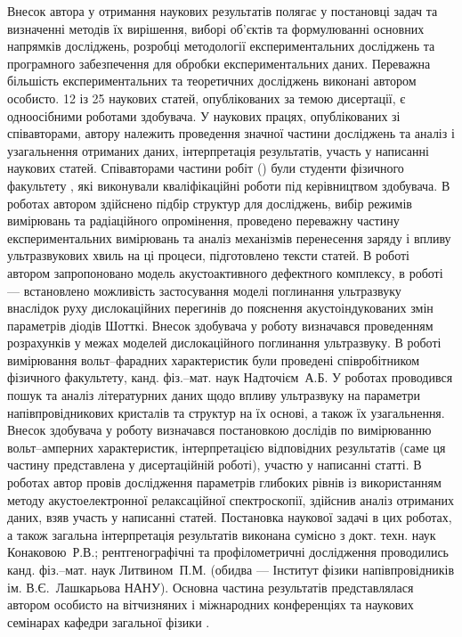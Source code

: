 {\contributionTXT}
Внесок автора у отримання наукових результатів полягає у постановці задач
та визначенні методів їх вирішення, виборі об'єктів та формулюванні
основних напрямків досліджень,
розробці методології експериментальних досліджень та програмного забезпечення для обробки експериментальних даних.
Переважна більшість експериментальних та теоретичних досліджень виконані автором особисто.
12 із 25 наукових статей, опублікованих за темою дисертації, є одноосібними роботами здобувача.
У наукових працях, опублікованих зі співавторами, автору належить проведення значної частини досліджень та аналіз і узагальнення отриманих
даних, інтерпретація результатів, участь у написанні наукових статей.
Співавторами частини робіт (\cite{Olikh2018JAP,Olikh:Ultras2016,Olikh2016JSem,OlikhJAP,Olikh:PZTF2006}) були студенти фізичного факультету \thesisOfOrganization,
які виконували кваліфікаційні роботи під керівництвом здобувача.
В роботах \cite{Olikh2018JAP,Olikh:Ultras2016,Olikh2016JSem,OlikhJAP,Olikh:SEMT2007,Olikh:MRS2007a,Olikh:PZTF2006} автором здійснено підбір структур для досліджень, вибір режимів вимірювань та радіаційного опромінення,
проведено переважну частину експериментальних вимірювань та аналіз механізмів перенесення заряду і впливу ультразвукових хвиль на ці процеси,
підготовлено тексти статей.
В роботі \cite{Olikh2018JAP} автором запропоновано модель акустоактивного дефектного комплексу,
в роботі \cite{Olikh:Ultras2016} --- встановлено можливість застосування моделі поглинання ультразвуку внаслідок руху дислокаційних перегинів до пояснення акустоіндукованих змін параметрів діодів Шотткі.
Внесок здобувача у роботу \cite{Olikh:UPJ2014} визначався проведенням розрахунків у межах моделей дислокаційного поглинання ультразвуку.
В роботі \cite{Olikh:UPJ2013} вимірювання вольт--фарадних характеристик були проведені співробітником фізичного факультету, канд. фіз.--мат. наук Надточієм~А.\:Б.
У роботах \cite{Olikh:SEMT2004,Olikh:SEMT2011} проводився пошук та аналіз літературних даних щодо впливу ультразвуку на параметри напівпровідникових кристалів та структур на їх основі, а також їх узагальнення.
Внесок здобувача у роботу \cite{Gorb2010} визначався постановкою дослідів по вимірюванню вольт--амперних характеристик,
інтерпретацією відповідних результатів (саме ця частину представлена у дисертаційній роботі), участю у написанні статті.
В роботах \cite{Olikh:PhChOM2005,Olikh:PJE2004} автор провів дослідження параметрів глибоких рівнів із використанням методу акустоелектронної релаксаційної спектроскопії,
здійснив аналіз отриманих даних, взяв участь у написанні статей.
Постановка наукової задачі в цих роботах, а також загальна інтерпретація результатів виконана сумісно з докт. техн. наук Конаковою~Р.\:В.;
рентгенографічні та профілометричні дослідження проводились канд. фіз.--мат. наук Литвином~П.\:М.  (обидва --- Інститут фізики напівпровідників ім. В.\:Є.~Лашкарьова НАНУ).
Основна частина результатів
представлялася автором особисто на вітчизняних і міжнародних конференціях
та наукових семінарах кафедри загальної фізики \thesisOfOrganization.







